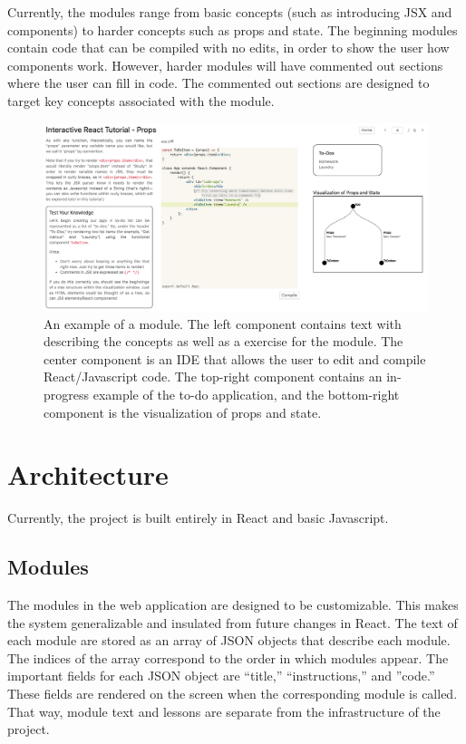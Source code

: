 \documentclass[11pt]{article}
\newcommand{\figcaption}[1]{\caption[]{#1}}
\begin{document}
Currently, the modules range from basic concepts (such as introducing JSX and components) to harder concepts such as props and state. The beginning modules contain code that can be compiled with no edits, in order to show the user how components work. However, harder modules will have commented out sections where the user can fill in code. The commented out sections are designed to target key concepts associated with the module.

\begin{figure}[h]

\begin{center}
\includegraphics[scale=0.35]{module.png}
\end{center}

\figcaption{An example of a module. The left component contains text with describing the concepts as well as a exercise for the module. The center component is an IDE that allows the user to edit and compile React/Javascript code. The top-right component contains an in-progress example of the to-do application, and the bottom-right component is the visualization of props and state.}

\label{fig:Module}

\end{figure}

\section{Architecture}

Currently, the project is built entirely in React and basic Javascript.

\subsection*{Modules}

The modules in the web application are designed to be customizable. This makes the system generalizable and insulated from future changes in React. The text of each module are stored as an array of JSON objects that describe each module. The indices of the array correspond to the order in which modules appear. The important fields for each JSON object are ``title,'' ``instructions,'' and ''code.'' These fields are rendered on the screen when the corresponding module is called. That way, module text and lessons are separate from the infrastructure of the project.
\end{document}
